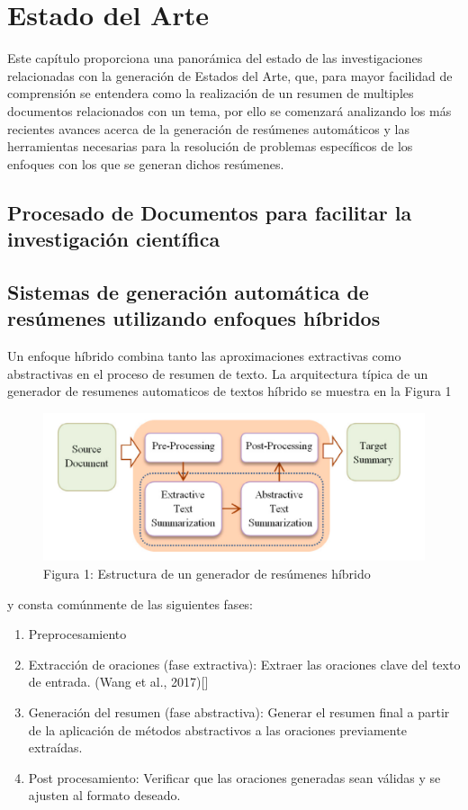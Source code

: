 \chapter{Estado del Arte}\label{chapter:state-of-the-art}
    Este capítulo proporciona una panorámica del estado de las investigaciones relacionadas con la generación de Estados del Arte, que, para mayor facilidad de comprensión se entendera como la realización de un resumen de multiples documentos relacionados con un tema, por ello se comenzará analizando los más recientes avances acerca de la generación de resúmenes automáticos y las herramientas necesarias para la resolución de problemas específicos de los enfoques con los que se generan dichos resúmenes.
\section{Procesado de Documentos para facilitar la investigación científica}


\section{Sistemas de generación automática de resúmenes utilizando enfoques híbridos}

Un enfoque híbrido combina tanto las aproximaciones extractivas como abstractivas en el proceso de resumen de texto. La arquitectura típica  de un generador de resumenes automaticos de textos híbrido se muestra en la Figura 1
\begin{figure}    
    \centering
    \includegraphics[scale = 0.5]{Figures/hybrid.png}
    \caption*{Figura 1: Estructura de un generador de resúmenes híbrido}
\end{figure}
    y consta comúnmente de las siguientes fases:


\begin{enumerate}
    \item Preprocesamiento
    \item Extracción de oraciones (fase extractiva): Extraer las oraciones clave del texto de entrada. (Wang et al., 2017)[\cite{Wang}]
    \item Generación del resumen (fase abstractiva): Generar el resumen final a partir de la aplicación de métodos abstractivos a las oraciones previamente extraídas.
    \item Post procesamiento: Verificar que las oraciones generadas sean válidas y se ajusten al formato deseado.
\end{enumerate}


